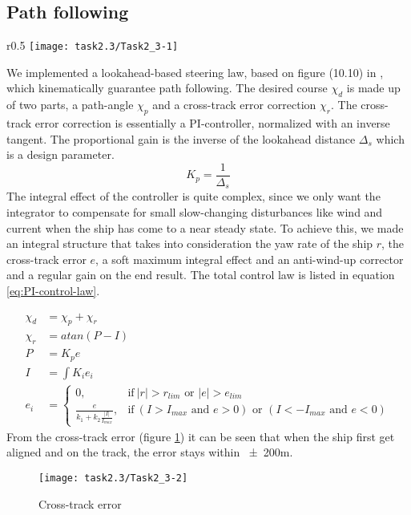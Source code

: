 \subsection{Path following}\label{subsec:prob2.2}
\begin{wrapfigure}{r}{0.5 \textwidth}
   \vspace{-30pt}
   \centering
    \texttt{[image: task2.3/Task2\_3-1]}
    \vspace{-20pt}
    \caption{Path following}
    \label{fig:2.3-path}
    \vspace{-10pt}
\end{wrapfigure}

We implemented a lookahead-based steering law, based on figure (10.10) in \cite{fossen_2011}, which kinematically guarantee path following. The desired course $\chi_d$ is made up of two parts, a path-angle $\chi_p$ and a cross-track error correction $\chi_r$. The cross-track error correction is essentially a PI-controller, normalized with an inverse tangent. The proportional gain is the inverse of the lookahead distance $\Delta_s$ which is a design parameter.
\begin{equation}
	K_p = \frac{1}{\Delta_s}
\end{equation}
The integral effect of the controller is quite complex, since we only want the integrator to compensate for small slow-changing disturbances like wind and current when the ship has come to a near steady state. To achieve this, we made an integral structure that takes into consideration the yaw rate of the ship $r$, the cross-track error $e$, a soft maximum integral effect and an anti-wind-up corrector and a regular gain on the end result. The total control law is listed in equation \ref{eq:PI-control-law}.

\begin{equation}
\begin{split}
	\chi_d &= \chi_p + \chi_r \\
	\chi_r &= atan(P - I) \\
	P &= K_p e \\
	I &= \int K_i e_i \\
	e_i &=	\begin{cases}
			0,								& \text{if}\ | r | > r_{lim} \text{ or }  | e | > e_{lim} \\
      			\frac{e}{k_1+k_2 \frac{| I |}{I_{max}}},		& \text{if}\ (I > I_{max} \text{ and } e>0) \text{ or }( I< -I_{max} \text{ and } e<0 )
      			\end{cases}
\end{split}
\label{eq:PI-control-law}
\end{equation}
From the cross-track error (figure \ref{fig:2.3-error}) it can be seen that when the ship first get aligned and on the track, the error stays within \num{\pm200}{m}.

\begin{figure}[ht]
   \centering
    \texttt{[image: task2.3/Task2\_3-2]}
    \caption{Cross-track error}
    \label{fig:2.3-error}
\end{figure}

